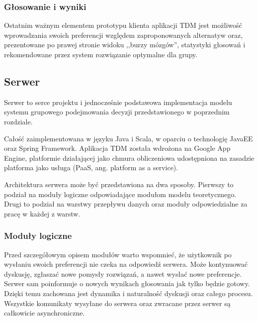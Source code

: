 \subsubsection{Głosowanie i wyniki}
Ostatnim ważnym elementem prototypu klienta aplikacji TDM jest możliwość
wprowadzania swoich preferencji względem zaproponowanych alternatyw oraz,
prezentowane po prawej stronie widoku ,,burzy mózgów'', statystyki głosowań i
rekomendowane przez system rozwiązanie optymalne dla grupy.

\subsection{Serwer}
Serwer to serce projektu i jednocześnie podstawowa implementacja modelu systemu
grupowego podejmowania decyzji przedstawionego w poprzednim rozdziale. 

Całość zaimplementowana w języku Java i Scala, w oparciu o technologię JavaEE
oraz Spring Framework. Aplikacja TDM została wdrożona na Google App Engine,
platformie działającej jako chmura obliczeniowa udostępniona na
zasadzie platforma jako usługa (PaaS, ang. platform as a service).

Architektura serwera może być przedstawiona na dwa sposoby. Pierwszy to podział
na moduły logiczne odpowiadające modułom modelu teoretycznego. Drugi to podział
na warstwy przepływu danych oraz moduły odpowiedzialne za pracę w każdej z warstw.

\subsubsection{Moduły logiczne}
Przed szczegółowym opisem modułów warto wspomnieć, że użytkownik po wysłaniu
swoich preferencji nie czeka na odpowiedź serwera. Może kontynuować dyskusję,
zgłaszać nowe pomysły rozwiązań, a nawet wysłać nowe preferencje. Serwer sam
poinformuje o nowych wynikach głosowania jak tylko będzie gotowy. Dzięki temu
zachowana jest dynamika i naturalność dyskusji oraz całego procesu. Wszystkie
komunikaty wysyłane do serwera oraz zwracane przez serwer są całkowicie
asynchroniczne.

